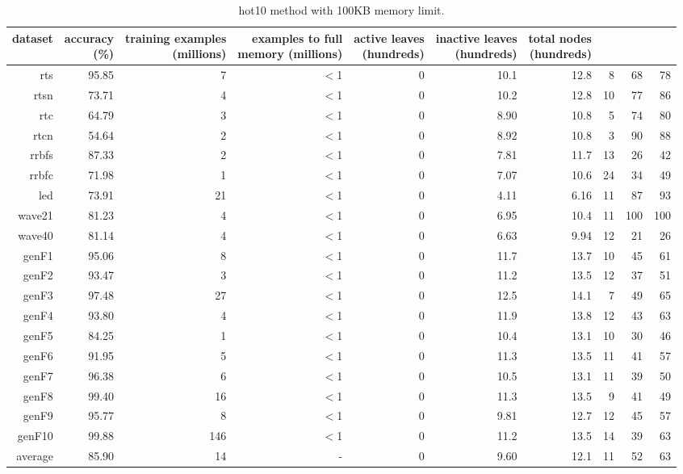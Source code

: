 \clearpage
\begin{table}
\caption{{\sc hot10} method with 100KB memory limit.}
\label{tab:hot10-100k}
\centering
\begin{tabular}{|r|r|r|r|r|r|r|r|r|r|}
\hline
dataset	&
\rotatebox{90}{\parbox{9em}{accuracy\\(\%)}} &
\rotatebox{90}{\parbox{9em}{training examples\\(millions)}} &
\rotatebox{90}{\parbox{9em}{examples to full\\memory (millions)}} &
\rotatebox{90}{\parbox{9em}{active leaves\\(hundreds)}} &
\rotatebox{90}{\parbox{9em}{inactive leaves\\(hundreds)}} &
\rotatebox{90}{\parbox{9em}{total nodes\\(hundreds)}} &
\rotatebox{90}{\parbox{9em}{tree depth}}	&
\rotatebox{90}{\parbox{9em}{training speed (\%)}} &
\rotatebox{90}{\parbox{9em}{prediction speed (\%)}} \\
\hline
{\sc rts} & 95.85 & 7 & $<$1 & 0 & 10.1 & 12.8 & 8 & 68 & 78 \\
{\sc rtsn} & 73.71 & 4 & $<$1 & 0 & 10.2 & 12.8 & 10 & 77 & 86 \\
{\sc rtc} & 64.79 & 3 & $<$1 & 0 & 8.90 & 10.8 & 5 & 74 & 80 \\
{\sc rtcn} & 54.64 & 2 & $<$1 & 0 & 8.92 & 10.8 & 3 & 90 & 88 \\
{\sc rrbfs} & 87.33 & 2 & $<$1 & 0 & 7.81 & 11.7 & 13 & 26 & 42 \\
{\sc rrbfc} & 71.98 & 1 & $<$1 & 0 & 7.07 & 10.6 & 24 & 34 & 49 \\
{\sc led} & 73.91 & 21 & $<$1 & 0 & 4.11 & 6.16 & 11 & 87 & 93 \\
{\sc wave21} & 81.23 & 4 & $<$1 & 0 & 6.95 & 10.4 & 11 & 100 & 100 \\
{\sc wave40} & 81.14 & 4 & $<$1 & 0 & 6.63 & 9.94 & 12 & 21 & 26 \\
{\sc genF1} & 95.06 & 8 & $<$1 & 0 & 11.7 & 13.7 & 10 & 45 & 61 \\
{\sc genF2} & 93.47 & 3 & $<$1 & 0 & 11.2 & 13.5 & 12 & 37 & 51 \\
{\sc genF3} & 97.48 & 27 & $<$1 & 0 & 12.5 & 14.1 & 7 & 49 & 65 \\
{\sc genF4} & 93.80 & 4 & $<$1 & 0 & 11.9 & 13.8 & 12 & 43 & 63 \\
{\sc genF5} & 84.25 & 1 & $<$1 & 0 & 10.4 & 13.1 & 10 & 30 & 46 \\
{\sc genF6} & 91.95 & 5 & $<$1 & 0 & 11.3 & 13.5 & 11 & 41 & 57 \\
{\sc genF7} & 96.38 & 6 & $<$1 & 0 & 10.5 & 13.1 & 11 & 39 & 50 \\
{\sc genF8} & 99.40 & 16 & $<$1 & 0 & 11.3 & 13.5 & 9 & 41 & 49 \\
{\sc genF9} & 95.77 & 8 & $<$1 & 0 & 9.81 & 12.7 & 12 & 45 & 57 \\
{\sc genF10} & 99.88 & 146 & $<$1 & 0 & 11.2 & 13.5 & 14 & 39 & 63 \\
\hline
average & 85.90 & 14 &  -  & 0 & 9.60 & 12.1 & 11 & 52 & 63 \\
\hline
\end{tabular}
\end{table}
